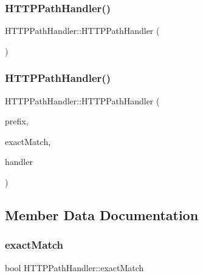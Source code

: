 \subsubsection{\texorpdfstring{H\+T\+T\+P\+Path\+Handler()}{HTTPPathHandler()}\hspace{0.1cm}{\footnotesize\ttfamily [1/2]}}
{\footnotesize\ttfamily H\+T\+T\+P\+Path\+Handler\+::\+H\+T\+T\+P\+Path\+Handler (\begin{DoxyParamCaption}{ }\end{DoxyParamCaption})\hspace{0.3cm}{\ttfamily [inline]}}

\mbox{\label{struct_h_t_t_p_path_handler_a9161b61163110ac69e928bc128b1a47c}} 
\subsubsection{\texorpdfstring{H\+T\+T\+P\+Path\+Handler()}{HTTPPathHandler()}\hspace{0.1cm}{\footnotesize\ttfamily [2/2]}}
{\footnotesize\ttfamily H\+T\+T\+P\+Path\+Handler\+::\+H\+T\+T\+P\+Path\+Handler (\begin{DoxyParamCaption}\item[{std\+::string}]{prefix,  }\item[{bool}]{exact\+Match,  }\item[{\mbox{\hyperlink{httpserver_8h_a90b0a9a188f591e83851dad2b701088f}{H\+T\+T\+P\+Request\+Handler}}}]{handler }\end{DoxyParamCaption})\hspace{0.3cm}{\ttfamily [inline]}}



\subsection{Member Data Documentation}
\mbox{\label{struct_h_t_t_p_path_handler_a2f7ea5761b24c8987869faf40af28a60}} 
\subsubsection{\texorpdfstring{exact\+Match}{exactMatch}}
{\footnotesize\ttfamily bool H\+T\+T\+P\+Path\+Handler\+::exact\+Match}

